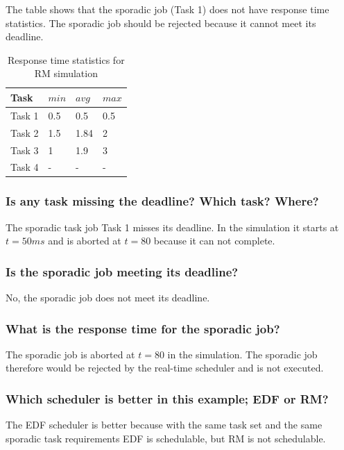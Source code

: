 \documentclass[a4paper]{article}
\begin{document}
The table shows that the sporadic job (Task 1) does not have response time statistics. The sporadic job should be rejected because it cannot meet its deadline.

\begin{table}[!htbp]
\begin{center}
\begin{tabular}{|l||l|l|l|}
\hline
Task   & $min$ & $avg$ & $max$ \\
\hline
\hline
Task 1 & 0.5 & 0.5 & 0.5 \\
\hline
Task 2 & 1.5 & 1.84 & 2 \\
\hline
Task 3 & 1 & 1.9 & 3 \\
\hline
Task 4 & - & - & - \\
\hline
\end{tabular}
\caption{Response time statistics for RM simulation}
\end{center}
\end{table}

\subsubsection{Is any task missing the deadline? Which task? Where?}
The sporadic task job Task 1 misses its deadline. In the simulation it starts at $t=50ms$ and is aborted at $t=80$ because it can not complete.

\subsubsection{Is the sporadic job meeting its deadline?}
No, the sporadic job does not meet its deadline.

\subsubsection{What is the response time for the sporadic job?}
The sporadic job is aborted at $t=80$ in the simulation. The sporadic job therefore would be rejected by the real-time scheduler and is not executed.

\subsubsection{Which scheduler is better in this example; EDF or RM?}
The EDF scheduler is better because with the same task set and the same sporadic task requirements EDF is schedulable, but RM is not schedulable.

\newpage
\end{document}
